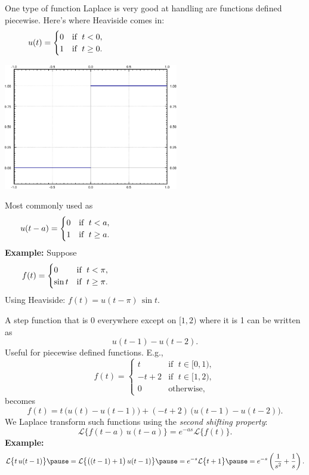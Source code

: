 \documentclass[10pt,aspectratio=169]{beamer}
\begin{document}
\begin{frame}
One type of function Laplace is very good at handling are functions defined
piecewise.  Here's where Heaviside comes in:
\[
u(t) =
\begin{cases}
0 & \text{if } \; t < 0 , \\ 
1 & \text{if } \; t \geq 0 .
\end{cases}
\hspace*{3in}
\]
\vspace*{-0.69in}

\hfill
\includegraphics[width=3.0in]{../figures/lt-heaviside}

\pause
\vspace*{-1.50in}

Most commonly used as
\[
u(t-a) =
\begin{cases}
0 & \text{if } \; t < a , \\ 
1 & \text{if } \; t \geq a .
\end{cases}
\hspace*{3in}
\]
\pause
\textbf{Example:}
Suppose
\begin{equation*}
f(t) =
\begin{cases}
0 & \text{if } \; t < \pi , \\ 
\sin t & \text{if } \; t \geq \pi .
\end{cases}
\hspace*{3in}
\end{equation*}
\pause
Using Heaviside: \quad $f(t) = u(t - \pi) \, \sin t$.
\end{frame}

\begin{frame}
A step function that is $0$ everywhere except on $[1,2)$ where it is 1
can be written as
\[
u(t - 1) - u(t-2) .
\]
\pause
Useful for piecewise defined functions.  E.g.,
\[
f(t) =
\begin{cases}
t & \text{if } \; t \in [0,1) , \\ 
-t+2 & \text{if } \; t \in [1,2), \\
0 & \text{otherwise} ,
\end{cases}
\]
becomes
\[
f(t) = t \, \bigl( u(t) - u(t-1) \bigr) + 
(-t+2) \, \bigl( u(t - 1) - u(t-2) \bigr) .
\]
\pause
We Laplace transform such functions using the \emph{second shifting property}:
\[
\mathcal{L} \bigl\{ f(t-a) \, u(t-a) \bigr\}
= e^{-as} \mathcal{L} \bigl\{ f(t) \bigr\} .
\]
\pause
\textbf{Example:}
\[
\mathcal{L} \bigl\{ t \, u(t-1) \bigr\}
\pause
=
\mathcal{L} \bigl\{ \bigl( (t-1) + 1\bigr) \, u(t-1) \bigr\}
\pause
= e^{-s} \mathcal{L} \bigl\{ t+1 \bigr\}
\pause
= e^{-s} \left(\frac{1}{s^2} + \frac{1}{s} \right)
.
\]
\end{frame}
\end{document}
